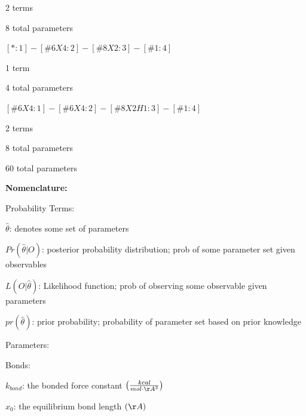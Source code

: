 \documentclass{report}
\begin{document}
\begin{outline}
\begin{outline}
\begin{outline}
\begin{outline}
            \item{2 terms}
            \item{8 total parameters}
          \end{outline}
        \item{$[*:1]-[\#6X4:2]-[\#8X2:3]-[\#1:4]$}
          \begin{outline}
            \item{1 term}
            \item{4 total parameters}
          \end{outline}
        \item{$[\#6X4:1]-[\#6X4:2]-[\#8X2H1:3]-[\#1:4]$}
          \begin{outline}
            \item{2 terms}
            \item{8 total parameters}
          \end{outline}  
      \end{outline}
    \item{60 total parameters}
  \end{outline}
  \item{\bf Nomenclature:}
    \begin{outline}
    \item{Probability Terms:}
      \begin{outline}
        \item{$\hat{\theta}$: denotes some set of parameters}
        \item{$Pr\left(\hat{\theta}|O \right)$: posterior probability distribution; prob of some parameter set given observables}
        \item{$L\left(O|\hat{\theta} \right)$: Likelihood function; prob of observing some observable given parameters}
        \item{$pr\left(\hat{\theta} \right)$: prior probability; probability of parameter set based on prior knowledge}
      \end{outline}
    \item{Parameters:}
      \begin{outline}
        \item{Bonds:}
          \begin{outline}
            \item{$k_{bond}$: the bonded force constant $\left(\frac{kcal}{mol \cdot \AA^2} \right)$}
            \item{$x_0$: the equilibrium bond length $\left(\AA \right)$}
          \end{outline}

\end{outline}
\end{outline}
\end{outline}
\end{document}
